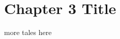 \documentclass[../book/book.tex]{subfiles}
\begin{document}
\chapter{Chapter 3 Title}

more tales here
\end{document}

